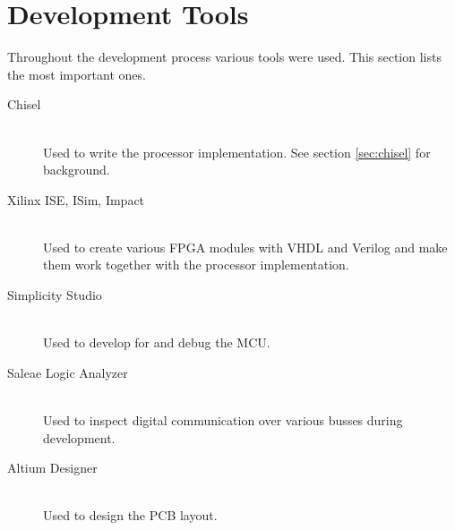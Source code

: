 \section{Development Tools}
Throughout the development process various tools were used.
This section lists the most important ones.

\begin{description}
    \item[Chisel]
    \hfill\\
    Used to write the processor implementation.
    See section \ref{sec:chisel} for background.
    \item[Xilinx ISE, ISim, Impact]
    \hfill\\
    Used to create various FPGA modules with VHDL and Verilog and make them work together with the processor implementation.
    \item[Simplicity Studio]
    \hfill\\
    Used to develop for and debug the MCU.
    \item[Saleae Logic Analyzer]
    \hfill\\
    Used to inspect digital communication over various busses during development.
    \item[Altium Designer]
    \hfill\\
    Used to design the PCB layout.
\end{description}

